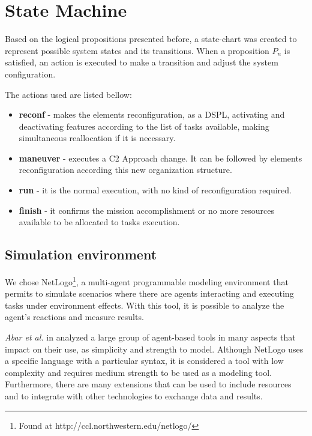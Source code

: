 \section{State Machine}%

Based on the logical propositions presented before, a state-chart was created to represent possible system states and its transitions. When a proposition $P_n$ is satisfied, an action is executed to make a transition and adjust the system configuration.

%

The actions used are listed bellow:

\begin{itemize}
    \item \textbf{reconf} - makes the elements reconfiguration, as a DSPL, activating and deactivating features according to the list of tasks available, making simultaneous reallocation if it is necessary.
    \item \textbf{maneuver} - executes a C2 Approach change. It can be followed by elements reconfiguration according this new organization structure.
    \item \textbf{run} - it is the normal execution, with no kind of reconfiguration required.
    \item \textbf{finish} - it confirms the mission accomplishment or no more resources available to be allocated to tasks execution.
\end{itemize}







\subsection{Simulation environment}
We chose NetLogo\footnote{Found at http://ccl.northwestern.edu/netlogo/}, a multi-agent programmable modeling environment that permits to simulate scenarios where there are agents interacting and executing tasks under environment effects. With this tool, it is possible to analyze the agent's reactions and measure results.

\textit{Abar et al.} in \cite{ABAR201713} analyzed a large group of agent-based tools in many aspects that impact on their use, as simplicity and strength to model. Although NetLogo uses a specific language with a particular syntax, it is considered a tool with low complexity and requires medium strength to be used as a modeling tool. Furthermore, there are many extensions that can be used to include resources and to  integrate with other technologies to exchange data and results.

